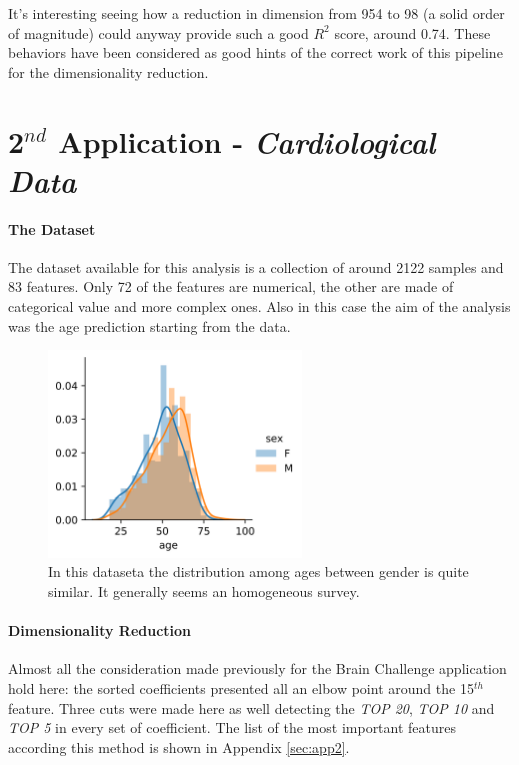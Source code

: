 \documentclass{article}
\begin{document}
It's interesting seeing how a reduction in dimension from 954 to 98 (a solid order of magnitude) could anyway provide such a good $R^2$ score, around 0.74. These behaviors have been considered as good hints of the correct work of this pipeline for the dimensionality reduction.

\section*{2$^{nd}$ Application - \emph{Cardiological Data}}

\paragraph{The Dataset} The dataset available for this analysis is a collection of around 2122 samples and 83 features. Only 72 of the features are numerical, the other are made of categorical value and more complex ones. Also in this case the aim of the analysis was the age prediction starting from the data.

\begin{figure}[ht]
	\centerline{\includegraphics[width=0.6\textwidth]{Cardio_distribution}}
	\caption{ In this dataseta the distribution among ages between gender is quite similar. It generally seems an homogeneous survey.}
	\label{fig:cardio_distr}
	\centering
\end{figure}


\paragraph{Dimensionality Reduction} Almost all the consideration made previously for the Brain Challenge application hold here: the sorted coefficients presented all an elbow point around the 15$^{th}$ feature. Three cuts were made here as well detecting the \emph{TOP 20}, \emph{TOP 10} and \emph{TOP 5} in every set of coefficient. The list of the most important features according this method is shown in Appendix \ref{sec:app2}.
\end{document}

